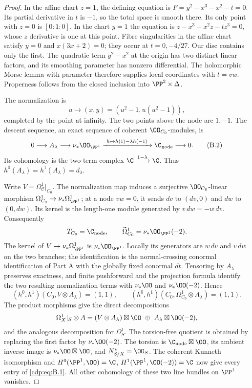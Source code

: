 \begin{proof}
In the affine chart $z=1$, the defining equation is $F=y^2-x^3-x^2-t=0$. Its partial derivative in $t$ is $-1$, so the total space is smooth there. Its only point with $z=0$ is $[0:1:0]$. In the chart $y=1$ the equation is $z-x^3-x^2z-tz^3=0$, whose $z$ derivative is one at this point. Fibre singularities in the affine chart satisfy $y=0$ and $x(3x+2)=0$; they occur at $t=0,-4/27$. Our disc contains only the first. The quadratic term $y^2-x^2$ at the origin has two distinct linear factors, and its smoothing parameter has nonzero differential. The holomorphic Morse lemma with parameter therefore supplies local coordinates with $t=vw$. Properness follows from the closed inclusion into $\PP^2\times\Delta$.

The normalization is
\[
 u\longmapsto(x,y)=(u^2-1,u(u^2-1)),
\]
completed by the point at infinity. The two points above the node are $1,-1$. The descent sequence, an exact sequence of coherent $\OO_{C_0}$-modules, is
\[
0\longrightarrow A_\lambda\longrightarrow\nu_*\OO_{\PP^1}
 \xrightarrow{\ h\mapsto h(1)-\lambda h(-1)\ }\C_{\rm node}
 \longrightarrow0.                                      \tag{B.2}\label{cdp:eq:B.2}
\]
Its cohomology is the two-term complex $\C\xrightarrow{1-\lambda}\C$. Thus $h^0(A_\lambda)=h^1(A_\lambda)=d_\lambda$.

Write $V=\Omega^1_{\mathcal C}|_{C_0}$. The normalization map induces a surjective $\OO_{C_0}$-linear morphism $\Omega^1_{C_0}\to\nu_*\Omega^1_{\PP^1}$; at a node $vw=0$, it sends $dv$ to $(dv,0)$ and $dw$ to $(0,dw)$. Its kernel is the length-one module generated by $v\,dw=-w\,dv$. Consequently
\[
 T_{C_0}=\C_{\rm node},\qquad
 \widetilde\Omega^1_{C_0}=\nu_*\OO_{\PP^1}(-2).
\]
The kernel of $V\to\nu_*\Omega^1_{\PP^1}$ is $\nu_*\OO_{\PP^1}$. Locally its generators are $w\,dv$ and $v\,dw$ on the two branches; the identification is the normal-crossing conormal identification of Part A with the globally fixed conormal $dt$. Tensoring by $A_\lambda$ preserves exactness, and finite pushforward and the projection formula identify the two resulting normalization terms with $\nu_*\OO$ and $\nu_*\OO(-2)$. Hence
\[
 (h^0,h^1)(C_0,V\otimes A_\lambda)=(1,1),\qquad
 (h^0,h^1)(C_0,\Omega^1_{C_0}\otimes A_\lambda)=(1,1).
\]
The product morphisms give the direct decompositions
\[
 \Omega^1_X|_S\otimes A
 =(V\otimes A_\lambda)\boxtimes\OO
 \ \oplus\ A_\lambda\boxtimes\OO(-2),
\]
and the analogous decomposition for $\Omega^1_S$. The torsion-free quotient is obtained by replacing the first factor by $\nu_*\OO(-2)$. The torsion is $\C_{\rm node}\boxtimes\OO$, its ambient inverse image is $\nu_*\OO\boxtimes\OO$, and $N^*_{S/X}=\OO_S$. The coherent Kunneth isomorphism and $H^0(\PP^1,\OO)=\C$, $H^1(\PP^1,\OO(-2))=\C$ now give every entry of \eqref{cdp:eq:B.1}. All other cohomology of these two line bundles on $\PP^1$ vanishes.


\end{proof}
